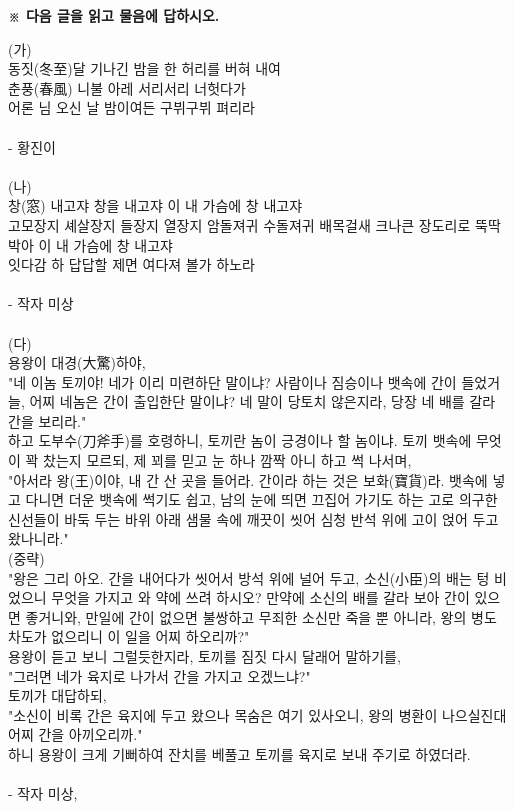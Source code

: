 \documentclass[11pt,a4paper]{article}
\begin{document}
\vspace{4mm}
{\small\textbf{※ 다음 글을 읽고 물음에 답하시오.}}
\vspace{2mm}
\begin{tcolorbox}[passage]
(가) \\{}
동짓(冬至)달 기나긴 밤을 한 허리를 버혀 내여 \\{}
춘풍(春風) 니불 아레 서리서리 너헛다가 \\{}
어론 님 오신 날 밤이여든 구뷔구뷔 펴리라 \\{}
\vspace{4pt} \\{}
- 황진이 \\{}
\vspace{4pt} \\{}
(나) \\{}
창(窓) 내고쟈 창을 내고쟈 이 내 가슴에 창 내고쟈 \\{}
고모장지 셰살장지 들장지 열장지 암돌져귀 수돌져귀 배목걸새 크나큰 장도리로 뚝딱 박아 이 내 가슴에 창 내고쟈 \\{}
잇다감 하 답답할 제면 여다져 볼가 하노라 \\{}
\vspace{4pt} \\{}
- 작자 미상 \\{}
\vspace{4pt} \\{}
(다) \\{}
용왕이 대경(大驚)하야, \\{}
"네 이놈 토끼야! 네가 이리 미련하단 말이냐? 사람이나 짐승이나 뱃속에 간이 들었거늘, 어찌 네놈은 간이 출입한단 말이냐? 네 말이 당토치 않은지라, 당장 네 배를 갈라 간을 보리라." \\{}
하고 도부수(刀斧手)를 호령하니, 토끼란 놈이 긍경이나 할 놈이냐. 토끼 뱃속에 무엇이 꽉 찼는지 모르되, 제 꾀를 믿고 눈 하나 깜짝 아니 하고 썩 나서며, \\{}
"아서라 왕(王)이야, 내 간 산 곳을 들어라. 간이라 하는 것은 보화(寶貨)라. 뱃속에 넣고 다니면 더운 뱃속에 썩기도 쉽고, 남의 눈에 띄면 끄집어 가기도 하는 고로 의구한 신선들이 바둑 두는 바위 아래 샘물 속에 깨끗이 씻어 심청 반석 위에 고이 얹어 두고 왔나니라." \\{}
(중략) \\{}
"왕은 그리 아오. 간을 내어다가 씻어서 방석 위에 널어 두고, 소신(小臣)의 배는 텅 비었으니 무엇을 가지고 와 약에 쓰려 하시오? 만약에 소신의 배를 갈라 보아 간이 있으면 좋거니와, 만일에 간이 없으면 불쌍하고 무죄한 소신만 죽을 뿐 아니라, 왕의 병도 차도가 없으리니 이 일을 어찌 하오리까?" \\{}
용왕이 듣고 보니 그럴듯한지라, 토끼를 짐짓 다시 달래어 말하기를, \\{}
"그러면 네가 육지로 나가서 간을 가지고 오겠느냐?" \\{}
토끼가 대답하되, \\{}
"소신이 비록 간은 육지에 두고 왔으나 목숨은 여기 있사오니, 왕의 병환이 나으실진대 어찌 간을 아끼오리까." \\{}
하니 용왕이 크게 기뻐하여 잔치를 베풀고 토끼를 육지로 보내 주기로 하였더라. \\{}
\vspace{4pt} \\{}
- 작자 미상,
\end{tcolorbox}
\end{document}
